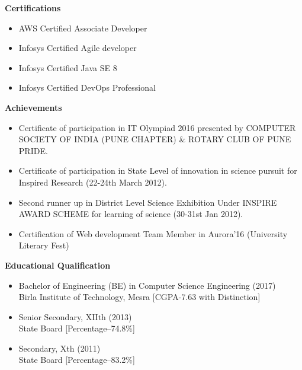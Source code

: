 \documentclass[a4paper,10pt]{article}
\newcommand{\resitem}[1]{\item #1}
\newcommand{\resheading}[1]{\vspace{0.5em} {\small \colorbox{mygrey}{{\begin{minipage}{0.975\textwidth}{{\textbf{#1}}}\end{minipage}}}} \vspace{0.5em}}
\begin{document}
\resheading{Certifications}
\begin{itemize}[nosep]
    \resitem{AWS Certified Associate Developer}
    \resitem{Infosys Certified Agile developer}
    \resitem{Infosys Certified Java SE 8}
    \resitem{Infosys Certified DevOps Professional}
\end{itemize}

\resheading{Achievements}
\begin{itemize}[nosep]
    \resitem{Certificate of participation in IT Olympiad 2016 presented by COMPUTER SOCIETY OF INDIA (PUNE CHAPTER) & ROTARY CLUB OF PUNE PRIDE.}
    \resitem{Certificate of participation in State Level of innovation in science pursuit for Inspired Research (22-24th March 2012).}
    \resitem{Second runner up in District Level Science Exhibition Under INSPIRE AWARD SCHEME for learning of science (30-31st Jan 2012).}
    \resitem{Certification of Web development Team Member in Aurora’16 (University Literary Fest)}
\end{itemize}

\resheading{Educational Qualification}
\begin{itemize}[nosep]
    \resitem{Bachelor of Engineering (BE) in Computer Science Engineering (2017) \\ Birla Institute of Technology, Mesra [CGPA-7.63 with Distinction]}
    \resitem{Senior Secondary, XIIth (2013) \\ State Board [Percentage–74.8\%]}
    \resitem{Secondary, Xth (2011) \\ State Board [Percentage–83.2\%]}
\end{itemize}
\end{document}
